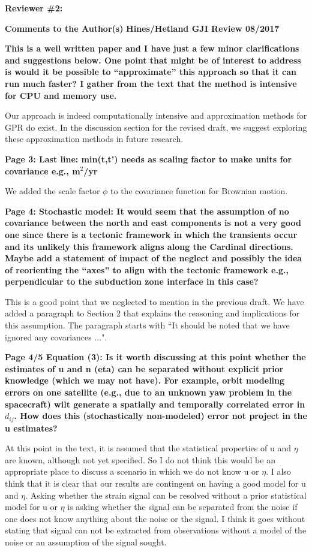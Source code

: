 \documentclass[10pt,a4paper]{letter}
\begin{document}
\begin{letter}{}
\textbf{Reviewer \#2:}\newline

\textbf{Comments to the Author(s)}
\textbf{Hines/Hetland GJI Review 08/2017}

\textbf{This is a well written paper and I have just a few minor
clarifications and suggestions below.  One point that might be of
interest to address is would it be possible to “approximate” this
approach so that it can run much faster?  I gather from the text that
the method is intensive for CPU and memory use.}

Our approach is indeed computationally intensive and approximation
methods for GPR do exist. In the discussion section for the revised
draft, we suggest exploring these approximation methods in future
research. 

\textbf{Page 3: Last line: min(t,t’) needs as scaling factor to make
units for covariance e.g., m$^2$/yr}

We added the scale factor $\phi$ to the covariance function for
Brownian motion.

\textbf{Page 4: Stochastic model: It would seem that the assumption of no
covariance between the north and east components is not a very good
one since there is a tectonic framework in which the transients occur
and its unlikely this framework aligns along the Cardinal directions.
Maybe add a statement of impact of the neglect and possibly the idea
of reorienting the “axes” to align with the tectonic framework e.g.,
perpendicular to the subduction zone interface in this case?}

This is a good point that we neglected to mention in the previous
draft. We have added a paragraph to Section 2 that explains the
reasoning and implications for this assumption. The paragraph starts
with ``It should be noted that we have ignored any covariances ...".

\textbf{Page 4/5 Equation (3): Is it worth discussing at this point whether
the estimates of u and n (eta) can be separated without explicit prior
knowledge (which we may not have).  For example, orbit modeling errors
on one satellite (e.g., due to an unknown yaw problem in the
spacecraft) wilt generate a spatially and temporally correlated error
in $d_{ij}$.  How does this (stochastically non-modeled) error not project
in the u estimates?}

At this point in the text, it is assumed that the statistical
properties of u and $\eta$ are known, although not yet specified. So I do
not think this would be an appropriate place to discuss a scenario in
which we do not know u or $\eta$. I also think that it is clear that our
results are contingent on having a good model for u and $\eta$. Asking
whether the strain signal can be resolved without a prior statistical
model for u or $\eta$ is asking whether the signal can be separated from
the noise if one does not know anything about the noise or the signal.
I think it goes without stating that signal can not be extracted from
observations without a model of the noise or an assumption of the
signal sought.


\end{letter}
\end{document}
